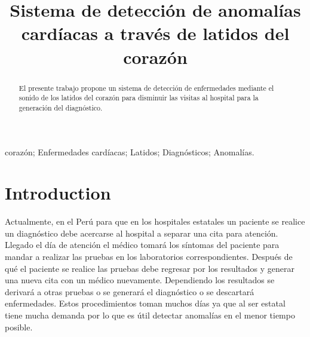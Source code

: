 \documentclass[conference]{IEEEtran}
\begin{document}
\title{Sistema de detección de anomalías cardíacas a través de latidos del corazón\\

}

\author{
\and
{}
\and
{}
\and
{}

}

\maketitle

\begin{abstract}
El presente trabajo propone un sistema de detección de enfermedades mediante el sonido de los latidos del corazón para disminuir las visitas al hospital para la generación del diagnóstico.
\end{abstract}

\begin{IEEEkeywords}
corazón; Enfermedades cardíacas; Latidos; Diagnósticos; Anomalías.
\end{IEEEkeywords}

\section{Introduction}
Actualmente, en el Perú para que en los hospitales estatales un paciente se realice un diagnóstico debe acercarse al hospital a separar una cita para atención. Llegado el día de atención el médico tomará los síntomas del paciente para mandar a realizar las pruebas en los laboratorios correspondientes. Después de qué el paciente se realice las pruebas debe regresar por los resultados y generar una nueva cita con un médico nuevamente. Dependiendo los resultados se derivará a otras pruebas o se generará el diagnóstico o se descartará enfermedades. Estos procedimientos toman muchos días ya que al ser estatal tiene mucha demanda por lo que es útil detectar anomalías en el menor tiempo posible.
\end{document}
